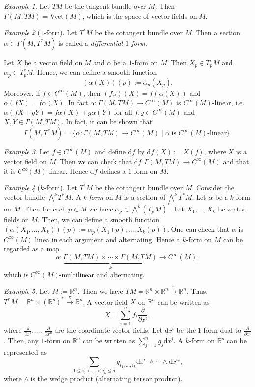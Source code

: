 \documentclass[11pt]{amsart}
\numberwithin{equation}{section}
\theoremstyle{plain}
\theoremstyle{definition}
\theoremstyle{remark}
\newtheorem{ex}{Example}[subsection]
\newcommand{\R}{\mathbb{R}}
\newcommand{\dd}{{\mathrm{d}}}
\begin{document}
\begin{ex}
Let $TM$ be the tangent bundle over $M$. Then $\Gamma(M,TM)=\mathrm{Vect}(M)$, which is the space of vector fields on $M$.
\end{ex}

\begin{ex}[$1$-form]
Let $T^*M$ be the cotangent bundle over $M$. Then a section $\alpha\in\Gamma(M,T^*M)$ is called a \emph{differential $1$-form}.
\end{ex}

Let $X$ be a vector field on $M$ and $\alpha$ be a $1$-form on $M$. Then $X_p\in T_pM$ and $\alpha_p\in T_p^*M$. Hence, we can define a smooth function 
$$(\alpha(X))(p):=\alpha_p(X_p).$$
Moreover, if $f\in C^\infty(M)$, then $(f\alpha)(X)=f(\alpha(X))$ and $\alpha(fX)=f\alpha(X)$. In fact $\alpha\colon \Gamma(M,TM)\to C^\infty(M)$ is $C^\infty(M)$-linear, i.e. $\alpha(fX+gY)=f\alpha(X)+g\alpha(Y)$ for all $f,g\in C^\infty(M)$ and $X,Y\in\Gamma(M,TM)$. In fact, it can be shown that $$\Gamma(M,T^*M)=\{\alpha\colon \Gamma(M,TM)\to C^\infty(M)\mid \text{$\alpha$ is $C^\infty(M)$-linear}\}.$$ 

\begin{ex}
Let $f\in C^\infty(M)$ and define $\dd f$ by $\dd f(X):=X(f)$, where $X$ is a vector field on $M$. Then we can check that $\dd f\colon \Gamma(M,TM)\to C^\infty(M)$ and that it is $C^\infty(M)$-linear. Hence $\dd f$ defines a $1$-form on $M$.
\end{ex}

\begin{ex}[$k$-form]
Let $T^*M$ be the cotangent bundle over $M$. Consider the vector bundle $\bigwedge^k T^*M$. A $k$-\emph{form} on $M$ is a section of $\bigwedge^k T^*M$. Let $\alpha$ be a $k$-form on $M$. Then for each $p\in M$ we have $\alpha_p\in\bigwedge^k(T_pM)^*$. Let $X_1,...,X_k$ be vector fields on $M$. Then, we can define a smooth function $(\alpha(X_1,...,X_k))(p):=\alpha_p(X_1(p),...,X_k(p))$. One can check that $\alpha$ is $C^\infty(M)$ linea in each argument and alternating. Hence a $k$-form on $M$ can be regarded as a map 
$$\alpha\colon \underbrace{\Gamma(M,TM)\times\dotsm \times \Gamma(M,TM)}_{k}\to C^\infty(M),$$
which is $C^\infty(M)$-multilinear and alternating.
\end{ex}

\begin{ex}
Let $M:=\R^n$. Then we have $TM=\R^n\times\R^n\xrightarrow{\pi}\R^n$. Thus, $T^*M=\R^n\times(\R^n)^*\xrightarrow{\pi}\R^n$. A vector field $X$ on $\R^n$ can be written as 
$$X=\sum_{i=1}^nf_i\frac{\partial}{\partial x^{i}},$$
where $\frac{\partial}{\partial x^1},...,\frac{\partial}{\partial x^n}$ are the coordinate vector fields. Let $\dd x^{i}$ be the $1$-form dual to $\frac{\partial}{\partial x^{i}}$. Then, any $1$-form on $\R^n$ can be written as $\sum_{j=1}^n g_j\dd x^{j}$. A $k$-form on $\R^n$ can be represented as 
$$\sum_{1\leq i_1<\dotsm <i_k\leq n}g_{i_1,...,i_k}\dd x^{i_1}\land\dotsm \land \dd x^{i_k},$$
where $\land$ is the wedge product (alternating tensor product).
\end{ex}
\end{document}
